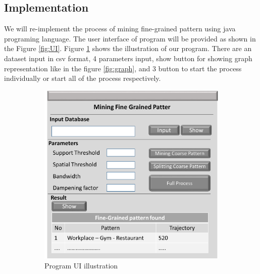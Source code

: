 \documentclass[a4paper,oneside]{article}
\begin{document}
		\subsection{Implementation}
		We will re-implement the process of mining fine-grained pattern using java programing language. The user interface of program will be provided as shown in the Figure \ref{fig:UI}. Figure \ref{fig:javagui} shows the illustration of our program. There are an dataset input in csv format, 4 parameters input,  show button for showing graph representation like in the figure \ref{fig:graph}, and 3 button to start the process individually or start all of the process respectively. 
		
		\begin{figure}[!h]
			\centering
			\begin{subfigure}[b]{0.4\linewidth}
				\centering
				\includegraphics[width=1\linewidth]{GUI}
				\caption{Program UI illustration}
				\label{fig:javagui}
			\end{subfigure}
				\begin{subfigure}[b]{0.4\linewidth}
				\centering

\end{subfigure}
\end{figure}
\end{document}
